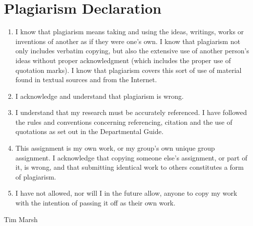 \chapter*{Plagiarism Declaration}
	\begin{enumerate}
	\item
	I know that plagiarism means taking and using the ideas, writings, works
	or inventions of another as if they were one's own. I know that plagiarism
	not only includes verbatim copying, but also the extensive use of another
	person's ideas without proper acknowledgment (which includes the proper
	use of quotation marks). I know that plagiarism covers this sort of use of
	material found in textual sources and from the Internet.
	\item
	I acknowledge and understand that plagiarism is wrong.
	\item
	I understand that my research must be accurately referenced. I have
	followed the rules and conventions concerning referencing, citation and
	the use of quotations as set out in the Departmental Guide.
	\item
	This assignment is my own work, or my group's own unique group assignment.
	I acknowledge that copying someone else's assignment, or part of
	it, is wrong, and that submitting identical work to others constitutes a
	form of plagiarism.
	\item
	I have not allowed, nor will I in the future allow, anyone to copy my work
	with the intention of passing it off as their own work.

	
	\end{enumerate}
		
	Tim Marsh
	
	\newpage